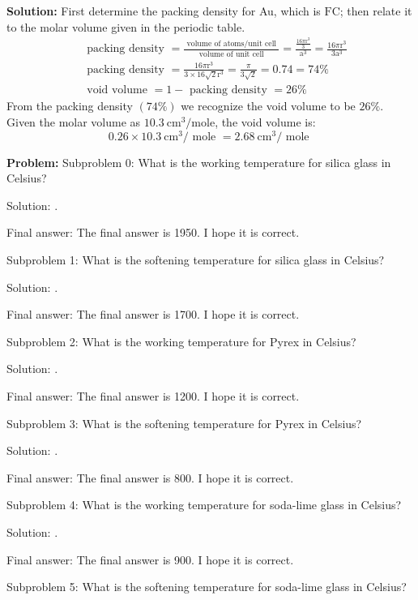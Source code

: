 \documentclass[10pt]{article}
\begin{document}
\textbf{Solution:}
First determine the packing density for Au, which is $\mathrm{FC}$; then relate it to the molar volume given in the periodic table.
\[
\begin{aligned}
&\text { packing density }=\frac{\text { volume of atoms/unit cell }}{\text { volume of unit cell }}=\frac{\frac{16 \pi \mathrm{r}^{3}}{3}}{\mathrm{a}^{3}}=\frac{16 \pi \mathrm{r}^{3}}{3 \mathrm{a}^{3}} \\
&\text { packing density }=\frac{16 \pi \mathrm{r}^{3}}{3 \times 16 \sqrt{2} \mathrm{r}^{3}}=\frac{\pi}{3 \sqrt{2}}=0.74=74 \% \\
&\text { void volume }=1-\text { packing density }=26 \%
\end{aligned}
\]
From the packing density $(74 \%)$ we recognize the void volume to be $26 \%$. Given the molar volume as $10.3 \mathrm{~cm}^{3} / \mathrm{mole}$, the void volume is:
\[
0.26 \times 10.3 \mathrm{~cm}^{3} / \text { mole }= \boxed{2.68} \mathrm{~cm}^{3} / \text { mole }
\]


\textbf{Problem:}
Subproblem 0: What is the working temperature for silica glass in Celsius?


Solution: .

Final answer: The final answer is 1950. I hope it is correct.

Subproblem 1: What is the softening temperature for silica glass in Celsius?


Solution: .

Final answer: The final answer is 1700. I hope it is correct.

Subproblem 2: What is the working temperature for Pyrex in Celsius?


Solution: .

Final answer: The final answer is 1200. I hope it is correct.

Subproblem 3: What is the softening temperature for Pyrex in Celsius?


Solution: .

Final answer: The final answer is 800. I hope it is correct.

Subproblem 4: What is the working temperature for soda-lime glass in Celsius?


Solution: .

Final answer: The final answer is 900. I hope it is correct.

Subproblem 5: What is the softening temperature for soda-lime glass in Celsius?
\end{document}
